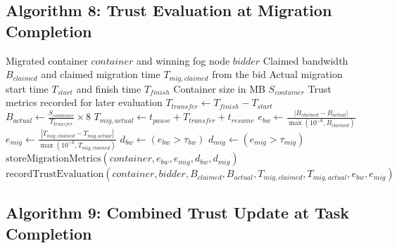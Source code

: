 \documentclass[12pt,a4paper]{article}
\begin{document}
\subsection{Algorithm 8: Trust Evaluation at Migration Completion}

\begin{algorithm}[H]
\caption{Evaluate Trust After Migration}
\begin{algorithmic}[1]
\Require Migrated container $container$ and winning fog node $bidder$
\Require Claimed bandwidth $B_{claimed}$ and claimed migration time $T_{mig,claimed}$ from the bid
\Require Actual migration start time $T_{start}$ and finish time $T_{finish}$
\Require Container size in MB $S_{container}$
\Ensure Trust metrics recorded for later evaluation
\State {}
\State $T_{transfer} \gets T_{finish} - T_{start}$
\State $B_{actual} \gets \frac{S_{container}}{T_{transfer}} \times 8$ 
\State $T_{mig,actual} \gets t_{pause} + T_{transfer} + t_{resume}$
\State
\State {}
\State $e_{bw} \gets \frac{|B_{claimed} - B_{actual}|}{\max(10^{-6}, B_{claimed})}$
\State $e_{mig} \gets \frac{|T_{mig,claimed} - T_{mig,actual}|}{\max(10^{-6}, T_{mig,claimed})}$
\State
\State {}
\State $d_{bw} \gets (e_{bw} > \tau_{bw})$ 
\State $d_{mig} \gets (e_{mig} > \tau_{mig})$ 
\State
\State {}
\State $\text{storeMigrationMetrics}(container, e_{bw}, e_{mig}, d_{bw}, d_{mig})$
\State
\State $\text{recordTrustEvaluation}(container, bidder, B_{claimed}, B_{actual}, T_{mig,claimed}, T_{mig,actual}, e_{bw}, e_{mig})$
\end{algorithmic}
\end{algorithm}

\subsection{Algorithm 9: Combined Trust Update at Task Completion}
\end{document}
